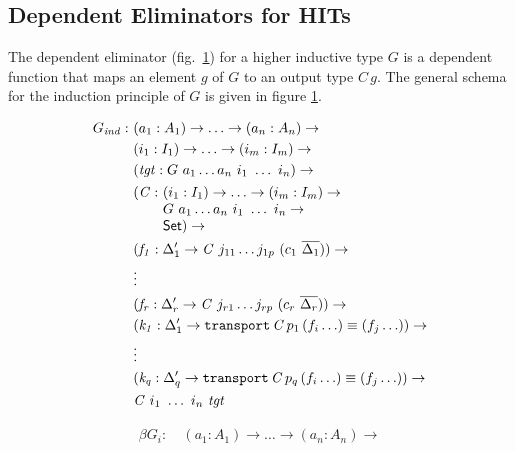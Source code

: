 \documentclass[runningheads]{llncs}
\begin{document}
\subsection{Dependent Eliminators for HITs}
\label{sec:sec4.2}

The dependent eliminator (fig.~\ref{fig:Gind}) for a higher inductive type $G$ is a dependent function that maps an element $g$ of $G$ to an output type $C \, g$. The general schema for the induction principle of $G$ is given in figure \ref{fig:Gind}.

\begin{figure}[t]
\centering
\begin{minipage}{.5\textwidth}
\centering
\fontsize{5.9pt}{2pt}\selectfont
\begin{align*}
G_{\mathit{ind}} :\ & (a_1 : A_1) \to \ldots \to (a_n : A_n) \to\\
& (i_1 : I_1) \to \ldots \to (i_m : I_m) \to\\
& (\mathit{tgt} : G\ a_1 \ldots a_n\ i_1\ \ldots\ i_n) \to\\
& \begin{array}{@{}l@{}l}(\mathit{C} :\ & (i_1 : I_1) \to \ldots \to (i_m : I_m) \to\\  & G\ a_1 \ldots a_n\ i_1\ \ldots\ i_n \to\\ &\SET{})\to\end{array} \\
& (\mathit{f_1} : \Delta_1^\prime \to \mathit{C}\ j_{11} \ldots j_{1p}\ (c_1\ \overline{\Delta_1})) \to \\
& \vdots\\
& (\mathit{f_r} : \Delta_r^\prime \to \mathit{C}\ j_{r1} \ldots j_{rp}\ (c_r\ \overline{\Delta_r})) \to \\
& (\mathit{k_1} : \Delta_1^\prime \to \texttt{transport} \, \mathit{C} \, p_1 \, (f_i \ldots) \equiv (f_j \ldots)) \to \\
& \vdots\\
& (\mathit{k_q} : \Delta_q^\prime \to \texttt{transport} \, \mathit{C} \, p_q \, (f_i \ldots) \equiv (f_j \ldots)) \to \\
& \mathit{C}\ i_1\ \ldots\ i_n\ \mathit{tgt}
\end{align*}
\label{fig:Gind}
\end{minipage}%
\begin{minipage}{.5\textwidth}
\centering
\fontsize{5.9pt}{2pt}\selectfont
\begin{align*}
\beta G_i :\ & (a_1 : A_1) \to \ldots \to (a_n : A_n) \to\\

\end{align*}
\end{minipage}
\end{figure}
\end{document}
